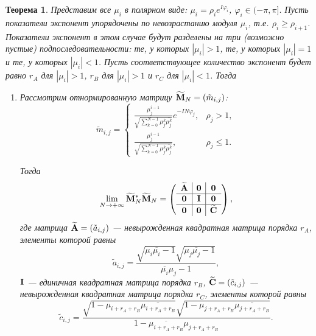 \documentclass[12pt,a4paper]{article}
\newtheorem{theorem}{Теорема}
\begin{document}
\begin{theorem} \label{th:wninconsistency}
	Представим все $\mu_i$ в полярном виде: $\mu_i = \rho_i e^{I \varphi_i}$, $\varphi_i \in (-\pi, \pi]$. Пусть показатели экспонент упорядочены по невозрастанию модуля $\mu_i$, т.е. $\rho_i \ge \rho_{i+1}$. Показатели экспонент в этом случае будут разделены на три (возможно пустые) подпоследовательности: те, у которых $|\mu_i|>1$, те, у которых $|\mu_i| = 1$ и те, у которых $|\mu_i| < 1$. Пусть соответствующее количество экспонент будет равно $r_A$ для $|\mu_i|>1$, $r_B$ для $|\mu_i|>1$ и $r_C$ для $|\mu_i|<1$. Тогда
	\begin{enumerate}
		\item Рассмотрим отнормированную матрицу $\widetilde {\mathbf{M}}_N = (\tilde m_{i, j})$: 
		\begin{equation*}
		\tilde m_{i, j} = \begin{cases}
		\frac{\mu_j^{i-1}}{\sqrt{\sum_{k=0}^{N-1} \mu_j^k \overline{\mu_j^k}}} e^{-I N \varphi_j}, & \rho_j > 1, \\
		\frac{\mu_j^{i-1}}{\sqrt{\sum_{k=0}^{N-1} \mu_j^k \overline{\mu_j^k}}}, & \rho_j \le 1.
		\end{cases}
		\end{equation*}
		
		Тогда \begin{equation*}
		\lim_{N \to + \infty} \widetilde {\mathbf{M}}_N^* \widetilde {\mathbf{M}}_N = \left( \begin{array}{c|c|c}
		\widetilde {\mathbf{A}} & \mathbf{0} & \mathbf{0} \\ \hline
		\mathbf{0} & \mathbf{I} & \mathbf{0} \\ \hline
		\mathbf{0} & \mathbf{0} & \widetilde {\mathbf{C}}
		\end{array}  \right),
		\end{equation*}
		где матрица $\widetilde {\mathbf{A}} = (\tilde a_{i, j})$ --- невырожденная квадратная матрица порядка $r_A$, элементы которой равны
		\begin{equation*}
		\tilde a_{i, j} = \frac{\sqrt{\mu_i \overline{\mu_i} - 1}\sqrt{\mu_j \overline{\mu_j} - 1}}{\overline{\mu_i} \mu_j - 1},
		\end{equation*}
		$\mathbf{I}$ --- единичная квадратная матрица порядка $r_B$, $\widetilde {\mathbf{C}} = (\tilde c_{i, j})$ --- невырожденная квадратная матрица порядка $r_C$, элементы которой равны
		\begin{equation*}
		\tilde c_{i, j} = \frac{\sqrt{1 - \mu_{i+r_A+r_B} \overline{\mu_{i+r_A+r_B}}}\sqrt{1 - \mu_{j+r_A+r_B} \overline{\mu_{j+r_A+r_B}}}}{1 - \overline{\mu_{i+r_A+r_B}} \mu_{j+r_A+r_B}}.
	    \end{equation*}
	    

\end{enumerate}
\end{theorem}
\end{document}

